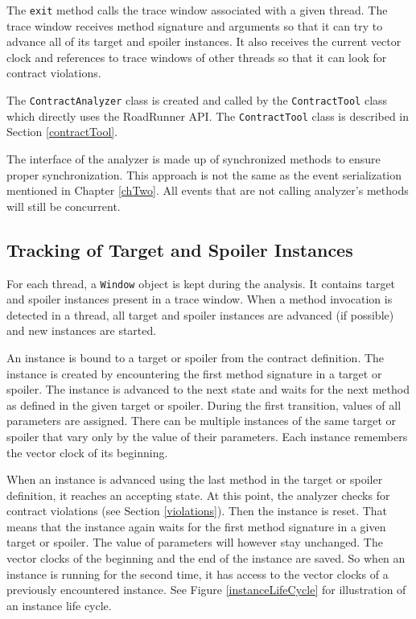 The \texttt{exit} method calls the trace window associated with a given thread.
The trace window receives method signature and arguments so that it can try to
advance all of its target and spoiler instances. It also receives the current
vector clock and references to trace windows of other threads so that it can
look for contract violations.

The \texttt{ContractAnalyzer} class is created and called by the
\texttt{ContractTool} class which directly uses the RoadRunner API. The
\texttt{ContractTool} class is described in Section \ref{contractTool}.

The interface of the analyzer is made up of synchronized methods to ensure
proper synchronization. This approach is not the same as the event serialization
mentioned in Chapter \ref{chTwo}. All events that are not calling analyzer's
methods will still be concurrent.

\subsection{Tracking of Target and Spoiler Instances}

For each thread, a \texttt{Window} object is kept during the analysis. It
contains target and spoiler instances present in a trace window. When a method
invocation is detected in a thread, all target and spoiler instances are
advanced (if possible) and new instances are started.

An instance is bound to a target or spoiler from the contract definition. The
instance is created by encountering the first method signature in a target or
spoiler. The instance is advanced to the next state and waits for the next
method as defined in the given target or spoiler. During the first transition,
values of all parameters are assigned. There can be multiple instances of the
same target or spoiler that vary only by the value of their parameters. Each
instance remembers the vector clock of its beginning.

When an instance is advanced using the last method in the target or spoiler
definition, it reaches an accepting state. At this point, the analyzer checks
for contract violations (see Section \ref{violations}). Then the instance is
reset. That means that the instance again waits for the first method signature
in a given target or spoiler. The value of parameters will however stay
unchanged. The vector clocks of the beginning and the end of the instance are
saved. So when an instance is running for the second time, it has access to the
vector clocks of a previously encountered instance. See Figure
\ref{instanceLifeCycle} for illustration of an instance life cycle.

